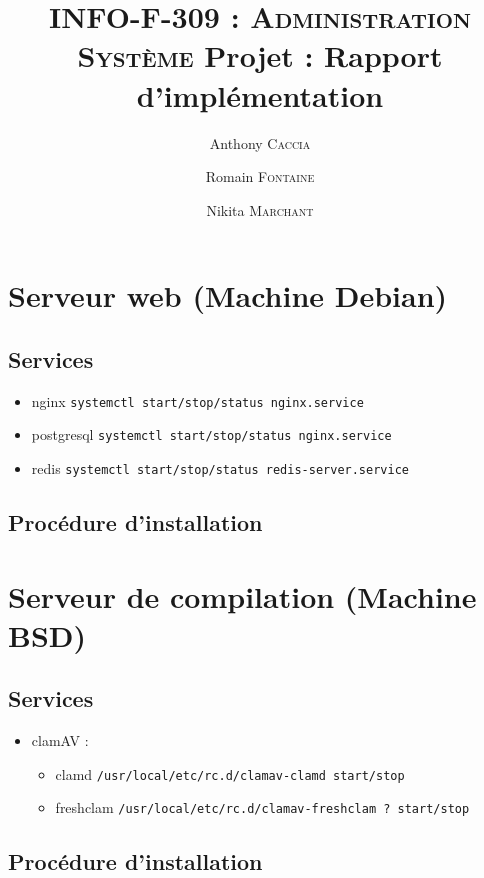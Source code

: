 \documentclass[10pt,a4paper]{article}
\author{Anthony \textsc{Caccia} \and Romain \textsc{Fontaine} \and Nikita \textsc{Marchant} }
\date{}
\title{\textsc{INFO-F-309 : Administration Système} Projet : Rapport d'implémentation}
\begin{document}
\maketitle

\section{Serveur web (Machine Debian)}
\subsection{Services}
\begin{itemize}
    \item nginx \texttt{systemctl start/stop/status nginx.service}
    \item postgresql \texttt{systemctl start/stop/status nginx.service}
    \item redis \texttt{systemctl start/stop/status redis-server.service}
\end{itemize}

\subsection{Procédure d'installation}


\section{Serveur de compilation (Machine BSD)}
\subsection{Services}
\begin{itemize}
    \item clamAV :
        \begin{itemize}
            \item clamd \texttt{/usr/local/etc/rc.d/clamav-clamd start/stop}
            \item freshclam \texttt{/usr/local/etc/rc.d/clamav-freshclam ? start/stop}
        \end{itemize}
\end{itemize}

\subsection{Procédure d'installation}
\end{document}
